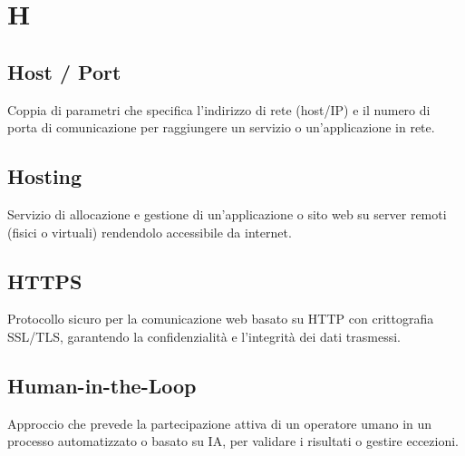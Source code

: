 \documentclass[a4paper, 11pt, oneside]{scrartcl} %
\begin{document}

\section*{H}


\subsection*{Host / Port}


Coppia di parametri che specifica l'indirizzo di rete (host/IP) e il numero di porta di comunicazione per raggiungere un servizio o un'applicazione in rete.

\vspace{0.5cm}

\subsection*{Hosting}


Servizio di allocazione e gestione di un'applicazione o sito web su server remoti (fisici o virtuali) rendendolo accessibile da internet.

\vspace{0.5cm}

\subsection*{HTTPS}


Protocollo sicuro per la comunicazione web basato su HTTP con crittografia SSL/TLS, garantendo la confidenzialità e l'integrità dei dati trasmessi.

\vspace{0.5cm}

\subsection*{Human-in-the-Loop}
Approccio che prevede la partecipazione attiva di un operatore umano in un processo automatizzato o basato su IA, per validare i risultati o gestire eccezioni.
\vspace{0.5cm}
\end{document}
